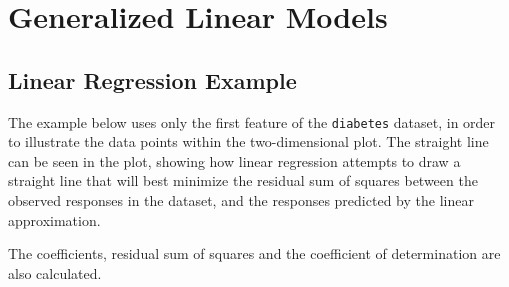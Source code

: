 \chapter{Generalized Linear Models}
\section{Linear Regression Example\label{Linear Regression Example}}
The example below uses only the first feature of the \verb|diabetes| dataset, in order to illustrate the data points within the two-dimensional plot. The straight line can be seen in the plot, showing how linear regression attempts to draw a straight line that will best minimize the residual sum of squares between the observed responses in the dataset, and the responses predicted by the linear approximation.

The coefficients, residual sum of squares and the coefficient of determination are also calculated.

